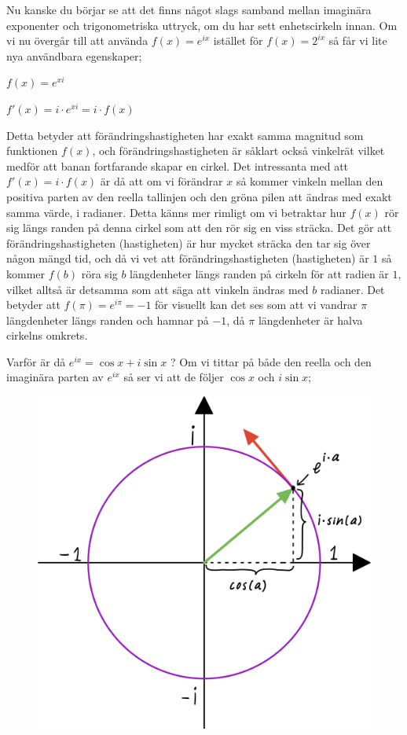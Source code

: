 \documentclass[10pt, a4paper]{amsart}
\begin{document}
Nu kanske du börjar se att det finns något slags samband mellan imaginära exponenter och trigonometriska uttryck, om du har sett enhetscirkeln innan. Om vi nu övergår till att använda $ f(x) = e^{ix} $ istället för $ f(x) = 2^{ix} $ så får vi lite nya användbara egenskaper;
\bigskip

\bigskip
\hspace{5ex}
$ f(x) = e^{xi} $

\hspace{5ex}
$ f'(x) = i \cdot e^{xi} = i \cdot f(x) $ 
\bigskip
\bigskip

Detta betyder att förändringshastigheten har exakt samma magnitud som funktionen $ f(x) $, 
och förändringshastigheten är såklart också vinkelrät vilket medför att banan fortfarande skapar en cirkel.
Det intressanta med att $ f'(x) = i \cdot f(x) $ är då att om vi förändrar $ x $ så kommer vinkeln mellan den positiva parten av den reella tallinjen och den gröna pilen att ändras med exakt samma värde, i radianer.
Detta känns mer rimligt om vi betraktar hur $ f(x) $ rör sig längs randen på denna cirkel som att den rör sig en viss sträcka. Det gör att förändringshastigheten (hastigheten) är hur mycket sträcka den tar sig över någon mängd tid,
och då vi vet att förändringshastigheten (hastigheten) är $ 1 $ så kommer $ f(b) $ röra sig $ b $ längdenheter längs randen på cirkeln för att radien är $ 1 $, vilket alltså är detsamma som att säga att vinkeln ändras med $ b $ radianer.
Det betyder att $ f(\pi) = e^{i\pi} = -1 $ för visuellt kan det ses som att vi vandrar $ \pi $ längdenheter längs randen och hamnar på $ -1 $, då $ \pi $ längdenheter är halva cirkelns omkrets.
\bigskip

Varför är då $ e^{ix} = \cos x + i\sin x $ ? Om vi tittar på både den reella och den imaginära parten av $ e^{ix} $ så ser vi att de följer $ \cos x $ och $ i\sin x $;

\begin{figure}[H]
    \includegraphics[width=50ex]{photos/chapter2/4.jpeg}
\end{figure}
\bigskip
\end{document}
